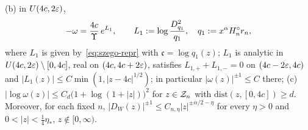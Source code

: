 \begin{lemma}
\begin{enumerate}
(b) in $U(4c,2\varepsilon)$,
\begin{equation}\label{eq:omega-4c}
  -\omega=\frac{4c}{\Upsilon}\,e^{L_1},\qquad L_1:=\log\frac{D_{q_1}^2}{q_1},\quad q_1:=x^\alpha H^{\circ}_n r_n ,
\end{equation}
where $L_1$ is given by~\eqref{eq:szego-repr} with $\mathfrak c=\log q_1(z)$; $L_1$ is analytic in $U(4c,2\varepsilon)\setminus[0,4c]$,
real on $(4c,4c+2\varepsilon)$, satisfies $L_{1,+}+L_{1,-}=0$ on $(4c-2\varepsilon,4c)$ and $|L_1(z)|\le C\min(1,|z-4c|^{1/2})$; in
particular $|\omega(z)|^{\pm1}\le C$ there;
(c) $|\log\omega(z)|\le C_d\bigl(1+\log(1+|z|)\bigr)^2$ for $z\in\mathcal{Z}_n$ with $\mathrm{dist}(z,[0,4c])\ge d$.
Moreover, for each fixed $n$, $|D_W(z)|^{\pm1}\le C_{n,\eta}|z|^{\pm\alpha/2-\eta}$ for every $\eta>0$ and
$0<|z|<\frac14\eta_*$, $z\notin[0,\infty)$.
\end{enumerate}
\end{lemma}

